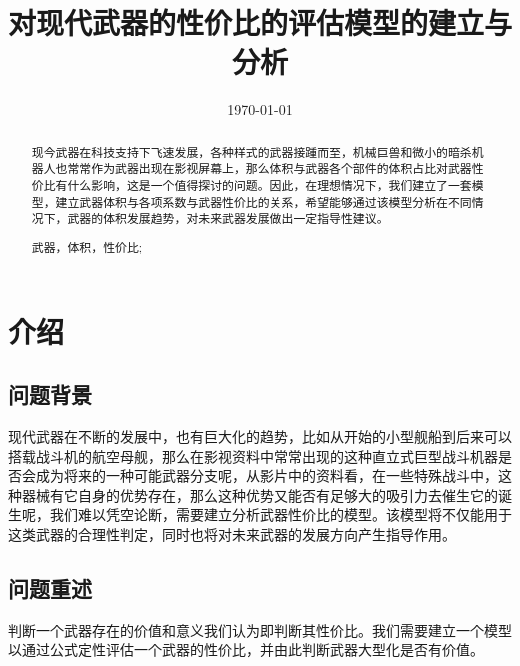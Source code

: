 \documentclass[UTF8]{mcmthesis}
\title{\large 对现代武器的性价比的评估模型的建立与分析}
\author{}
\date{\today}
\begin{document}
\begin{abstract}
现今武器在科技支持下飞速发展，各种样式的武器接踵而至，机械巨兽和微小的暗杀机器人也常常作为武器出现在影视屏幕上，那么体积与武器各个部件的体积占比对武器性价比有什么影响，这是一个值得探讨的问题。因此，在理想情况下，我们建立了一套模型，建立武器体积与各项系数与武器性价比的关系，希望能够通过该模型分析在不同情况下，武器的体积发展趋势，对未来武器发展做出一定指导性建议。

\begin{keywords}
武器，体积，性价比; \\ \hspace*{1.2cm}
\end{keywords}
\end{abstract}
\maketitle
\newpage                                                          
\begin{adjustwidth}{-1cm}{0cm}

\setcounter{tocdepth}{3}
\thispagestyle{empty}
\tableofcontents                                                  

\end{adjustwidth}


\newpage

\pagestyle{fancy}

\setcounter{page}{1}
\section{介绍}
\subsection{问题背景}

现代武器在不断的发展中，也有巨大化的趋势，比如从开始的小型舰船到后来可以搭载战斗机的航空母舰，那么在影视资料中常常出现的这种直立式巨型战斗机器是否会成为将来的一种可能武器分支呢，从影片中的资料看，在一些特殊战斗中，这种器械有它自身的优势存在，那么这种优势又能否有足够大的吸引力去催生它的诞生呢，我们难以凭空论断，需要建立分析武器性价比的模型。该模型将不仅能用于这类武器的合理性判定，同时也将对未来武器的发展方向产生指导作用。

\subsection{问题重述}

判断一个武器存在的价值和意义我们认为即判断其性价比。我们需要建立一个模型以通过公式定性评估一个武器的性价比，并由此判断武器大型化是否有价值。
\end{document}
